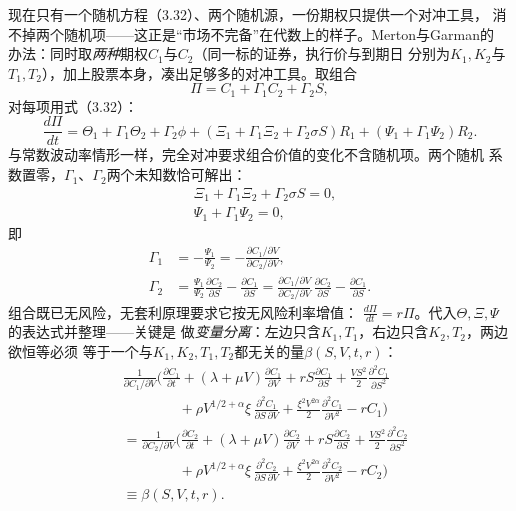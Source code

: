 现在只有一个随机方程（3.32）、两个随机源，一份期权只提供一个对冲工具，
消不掉两个随机项——这正是“市场不完备”在代数上的样子。Merton与Garman的
办法：同时取\emph{两种}期权$C_1$与$C_2$（同一标的证券，执行价与到期日
分别为$K_1,K_2$与$T_1,T_2$），加上股票本身，凑出足够多的对冲工具。取组合
\begin{equation*}
\Pi=C_{1}+\Gamma_{1}C_{2}+\Gamma_{2}S,
\end{equation*}
对每项用式（3.32）：
\begin{equation*}
\frac{d\Pi}{dt}
=\Theta_{1}+\Gamma_{1}\Theta_{2}+\Gamma_{2}\phi
+(\Xi_{1}+\Gamma_{1}\Xi_{2}+\Gamma_{2}\sigma S)R_{1}
+(\Psi_{1}+\Gamma_{1}\Psi_{2})R_{2}.
\end{equation*}
与常数波动率情形一样，完全对冲要求组合价值的变化不含随机项。两个随机
系数置零，$\Gamma_1$、$\Gamma_2$两个未知数恰可解出：
\begin{align*}
&\Xi_{1}+\Gamma_{1}\Xi_{2}+\Gamma_{2}\sigma S=0,\\
&\Psi_{1}+\Gamma_{1}\Psi_{2}=0,
\end{align*}
即
\begin{align*}
\Gamma_{1}&=-\frac{\Psi_{1}}{\Psi_{2}}
=-\frac{\partial C_{1}/\partial V}{\partial C_{2}/\partial V},\\
\Gamma_{2}&=\frac{\Psi_{1}}{\Psi_{2}}\frac{\partial C_{2}}{\partial S}
-\frac{\partial C_{1}}{\partial S}
=\frac{\partial C_{1}/\partial V}{\partial C_{2}/\partial V}
\,\frac{\partial C_{2}}{\partial S}
-\frac{\partial C_{1}}{\partial S}.
\end{align*}
组合既已无风险，无套利原理要求它按无风险利率增值：
$\frac{d\Pi}{dt}=r\Pi$。代入$\Theta,\Xi,\Psi$的表达式并整理——关键是
做\emph{变量分离}：左边只含$K_1,T_1$，右边只含$K_2,T_2$，两边欲恒等必须
等于一个与$K_1,K_2,T_1,T_2$都无关的量$\beta(S,V,t,r)$：
\begin{align*}
&\frac{1}{\partial C_{1}/\partial V}\biggl(
\frac{\partial C_{1}}{\partial t}
+(\lambda+\mu V)\frac{\partial C_{1}}{\partial V}
+rS\frac{\partial C_{1}}{\partial S}
+\frac{VS^{2}}{2}\frac{\partial^{2}C_{1}}{\partial S^{2}}\\
&\qquad\qquad+\rho V^{1/2+\alpha}\xi\,\frac{\partial^{2}C_{1}}{\partial S\,\partial V}
+\frac{\xi^{2}V^{2\alpha}}{2}\frac{\partial^{2}C_{1}}{\partial V^{2}}
-rC_{1}\biggr)\\
&=\frac{1}{\partial C_{2}/\partial V}\biggl(
\frac{\partial C_{2}}{\partial t}
+(\lambda+\mu V)\frac{\partial C_{2}}{\partial V}
+rS\frac{\partial C_{2}}{\partial S}
+\frac{VS^{2}}{2}\frac{\partial^{2}C_{2}}{\partial S^{2}}\\
&\qquad\qquad+\rho V^{1/2+\alpha}\xi\,\frac{\partial^{2}C_{2}}{\partial S\,\partial V}
+\frac{\xi^{2}V^{2\alpha}}{2}\frac{\partial^{2}C_{2}}{\partial V^{2}}
-rC_{2}\biggr)\\
&\equiv\beta(S,V,t,r).
\tag{3.33}
\end{align*}

